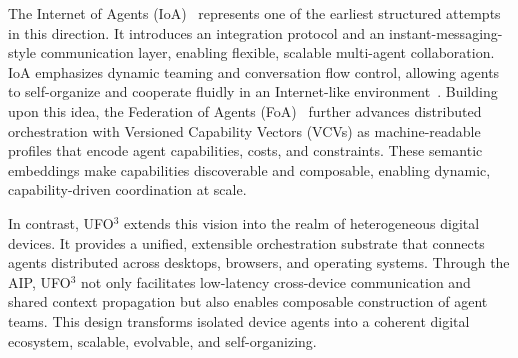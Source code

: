 \documentclass[10pt]{article} %
\newcommand{\ufo}{\textsc{UFO}$^3$\xspace}
\newcommand{\bench}{\textsc{NebulaBench}\xspace}
\newcommand{\TaskConstellation}{\textsc{TaskConstellation}\xspace}
\begin{document}
The Internet of Agents (IoA)~\cite{cheninternet} represents one of the earliest structured attempts in this direction. It introduces an integration protocol and an instant-messaging-style communication layer, enabling flexible, scalable multi-agent collaboration. IoA emphasizes dynamic teaming and conversation flow control, allowing agents to self-organize and cooperate fluidly in an Internet-like environment~\cite{yang2025agentic}. Building upon this idea, the Federation of Agents (FoA)~\cite{giusti2025federation} further advances distributed orchestration with Versioned Capability Vectors (VCVs) as machine-readable profiles that encode agent capabilities, costs, and constraints. These semantic embeddings make capabilities discoverable and composable, enabling dynamic, capability-driven coordination at scale.

In contrast, \ufo extends this vision into the realm of heterogeneous digital devices. It provides a unified, extensible orchestration substrate that connects agents distributed across desktops, browsers, and operating systems. Through the AIP, \ufo not only facilitates low-latency cross-device communication and shared context propagation but also enables composable construction of agent teams. This design transforms isolated device agents into a coherent digital ecosystem, scalable, evolvable, and self-organizing.



\end{document}
